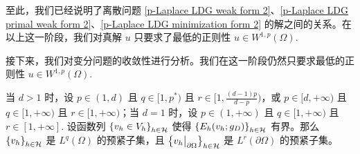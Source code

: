 至此，我们已经说明了离散问题 \eqref{p-Laplace LDG weak form 2}、\eqref{p-Laplace LDG primal weak form 2}、\eqref{p-Laplace LDG minimization form 2} 的解之间的关系。在以上这一阶段，我们对真解 \(u\) 只要求了最低的正则性 \(u \in W^{1,p}(\Omega)\). 

接下来，我们对变分问题的收敛性进行分析。我们在这一阶段仍然只要求最低的正则性 \(u \in W^{1,p}(\Omega)\). 


\begin{theorem}\label{p-Laplace LDG2 Pre-compactness}
	当 \(d > 1\) 时，设 \(p \in (1, d)\) 且 \(q \in [1, p^{\ast})\) 且 \(r \in [1, \frac{(d-1)p}{d-p})\)，或 \(p \in [d, +\infty)\) 且 \(q \in [1, +\infty)\) 且 \(r \in [1, +\infty)\)；当 \(d = 1\) 时，设 \(p \in (1, +\infty)\) 且 \(q \in [1, +\infty)\) 且 \(r \in [1, +\infty]\). 设函数列 \(\left\{v_{h} \in V_{h}\right\}_{h \in \mathcal{H}}\) 使得 \(\left\{E_{h}(v_{h}; g_{D})\right\}_{h \in \mathcal{H}}\) 有界。那么 \(\left\{v_{h}\right\}_{h \in \mathcal{H}}\) 是 \(L^{q}(\Omega)\) 的预紧子集，且 \(\left\{v_{h}\big|_{\partial\Omega}\right\}_{h \in \mathcal{H}}\) 是 \(L^{r}(\partial\Omega)\) 的预紧子集。


\end{theorem}
